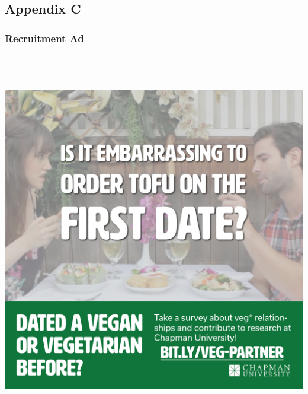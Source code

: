 \documentclass[twoside]{report}
\begin{document}
\hypertarget{appendix-c}{\subsection{Appendix C}}

\hypertarget{recruitment-ad}{%
\subsubsection{Recruitment Ad}\label{recruitment-ad}}

\includegraphics[width=6.5in,height=6.5in]{images/soyboys.jpg}
\end{document}
